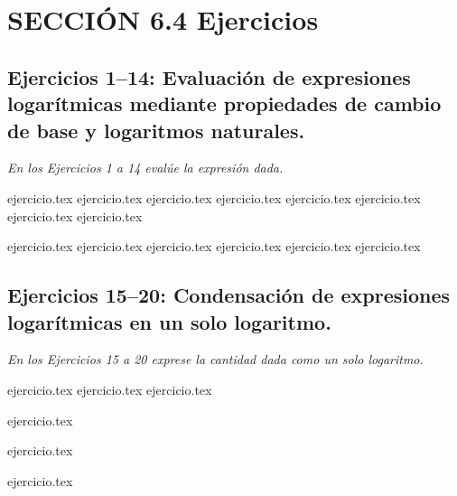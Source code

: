 
\section*{SECCIÓN 6.4 \quad Ejercicios}

\subsection*{Ejercicios 1--14: Evaluación de expresiones logarítmicas mediante propiedades de cambio de base y logaritmos naturales.}

\noindent \textit{En los Ejercicios 1 a 14 evalúe la expresión dada.}

\begin{enumerate}
    \begin{minipage}{0.45\textwidth}
    {ejercicio.tex}
    {ejercicio.tex}
    {ejercicio.tex}
    {ejercicio.tex}
    {ejercicio.tex}
    {ejercicio.tex}
    {ejercicio.tex}
    {ejercicio.tex}
    \end{minipage}%
    \begin{minipage}{0.45\textwidth}
    {ejercicio.tex}
    {ejercicio.tex}
    {ejercicio.tex}
    {ejercicio.tex}
    {ejercicio.tex}
    {ejercicio.tex}
    \end{minipage}
\end{enumerate}

\subsection*{Ejercicios 15--20: Condensación de expresiones logarítmicas en un solo logaritmo.}

\noindent \textit{En los Ejercicios 15 a 20 exprese la cantidad dada como un solo logaritmo.}

\begin{enumerate}
    \setcounter{enumi}{14}
    \begin{minipage}{0.45\textwidth}
    {ejercicio.tex}
    {ejercicio.tex}
    {ejercicio.tex}
    \end{minipage}%
    \begin{minipage}{0.45\textwidth}
    {ejercicio.tex}
    \addtocounter{enumi}{1}
    {ejercicio.tex}
    \addtocounter{enumi}{1}
    {ejercicio.tex}
    \end{minipage}
\end{enumerate}

